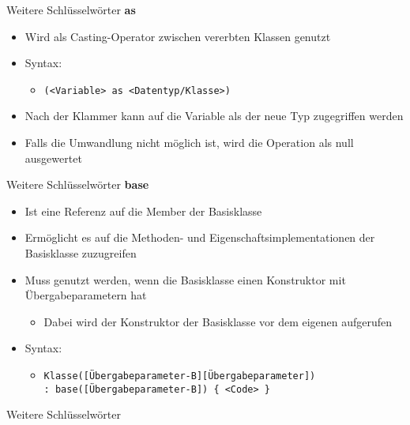 \begin{frame}{Weitere Schlüsselwörter}
	\textbf{as}\\
	\begin{itemize}
		\item Wird als Casting-Operator zwischen vererbten Klassen genutzt
		\item Syntax:
		\begin{itemize}
			\item \texttt{(\alert{<Variable>} as \alert{<Datentyp/Klasse>})}
		\end{itemize}
		\item Nach der Klammer kann auf die Variable als der neue Typ zugegriffen werden
		\item Falls die Umwandlung nicht möglich ist, wird die Operation als \alert{null} ausgewertet
	\end{itemize}	
	
\end{frame}

\begin{frame}{Weitere Schlüsselwörter}
	\textbf{base}\\
	\begin{itemize}
		\item Ist eine Referenz auf die Member der Basisklasse
		\item Ermöglicht es auf die Methoden- und Eigenschaftsimplementationen der Basisklasse zuzugreifen
	\end{itemize}
	\begin{itemize}
		\item Muss genutzt werden, wenn die Basisklasse einen Konstruktor mit Übergabeparametern hat
		\begin{itemize}
			\item Dabei wird der Konstruktor der Basisklasse vor dem eigenen aufgerufen
		\end{itemize}
		\item Syntax:
		\begin{itemize}
			\item \texttt{\alert{Klasse}(\alert{[Übergabeparameter-B][Übergabeparameter]})\\ : base(\alert{[Übergabeparameter-B]}) \{ \alert{<Code>} \}}
		\end{itemize}
	\end{itemize}
\end{frame}

\begin{frame}{Weitere Schlüsselwörter}
	
\end{frame}

